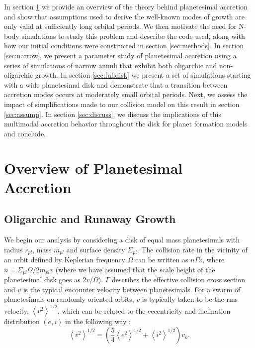 \documentclass[twocolumn,linenumbers]{aastex63}
\begin{document}
In section \ref{sec:theory} we provide an overview of the theory
behind planetesimal accretion and show that assumptions used to derive
the well-known modes of growth are only valid at sufficiently long
orbital periods. We then motivate the need for N-body simulations to
study this problem and describe the code used, along with how our
initial conditions were constructed in section \ref{sec:methods}. In
section \ref{sec:narrow}, we present a parameter study of planetesimal
accretion using a series of simulations of narrow annuli that exhibit both oligarchic and non-oligarchic growth. In section 
\ref{sec:fulldisk} we present a set of simulations starting with a  wide planetesimal disk and demonstrate that a transition 
between accretion modes occurs at moderately small orbital periods. Next, we assess the impact of 
simplifications made to our collision model on this result in section \ref{sec:assump}. In section \ref{sec:discuss}, we discuss the 
implications of this multimodal accretion behavior throughout the disk for planet formation models and conclude.

\section{Overview of Planetesimal Accretion}\label{sec:theory}

\subsection{Oligarchic and Runaway Growth}

We begin our analysis by considering a disk of equal mass planetesimals
with radius $r_{pl}$, mass $m_{pl}$ and surface density
$\Sigma_{pl}$. The collision rate in the vicinity of an orbit defined
by Keplerian frequency $\Omega$ can be written as $n \Gamma v$, where
$n = \Sigma_{pl} \Omega / 2 m_{pl} v$ (where we have assumed that the scale height of the planetesimal disk goes as $2v/\Omega$). $\Gamma$ describes the effective
collision cross section and $v$ is the typical encounter velocity
between planetesimals.
For a swarm of planetesimals on randomly oriented orbits, $v$ is typically
taken to be the rms velocity, $\left< v^{2} \right>^{1/2}$, which can be related to the eccentricity and inclination distribution $(e, i)$ in the following way \citep{lissauer93}:
\begin{equation}\label{eq:ecc_vel}
	\left< v^{2} \right>^{1/2} = \left( \frac{5}{4} \left< e^{2} \right>^{1/2} + \left< i^{2} \right>^{1/2}  \right) v_{k}.
\end{equation}
\end{document}
